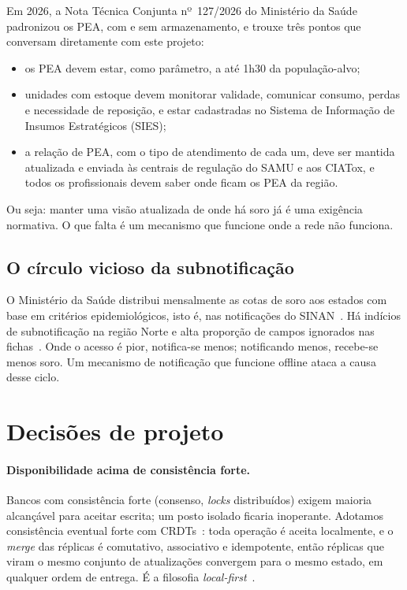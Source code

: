\documentclass[a4paper,12pt]{article}
\begin{document}
Em 2026, a Nota Técnica Conjunta nº~127/2026 do Ministério da
Saúde~\cite{nt127} padronizou os PEA, com e sem armazenamento, e trouxe três
pontos que conversam diretamente com este projeto:
\begin{itemize}
  \item os PEA devem estar, como parâmetro, a até 1h30 da população-alvo;
  \item unidades com estoque devem monitorar validade, comunicar consumo,
        perdas e necessidade de reposição, e estar cadastradas no Sistema de
        Informação de Insumos Estratégicos (SIES);
  \item a relação de PEA, com o tipo de atendimento de cada um, deve ser mantida
        atualizada e enviada às centrais de regulação do SAMU e aos CIATox,
        e todos os profissionais devem saber onde ficam os PEA da região.
\end{itemize}
Ou seja: manter uma visão atualizada de onde há soro já é uma exigência
normativa. O que falta é um mecanismo que funcione onde a rede não funciona.

\subsection{O círculo vicioso da subnotificação}

O Ministério da Saúde distribui mensalmente as cotas de soro aos estados com
base em critérios epidemiológicos, isto é, nas notificações do
SINAN~\cite{nt127}. Há indícios de subnotificação na região Norte e alta
proporção de campos ignorados nas fichas~\cite{completude2023}. Onde o
acesso é pior, notifica-se menos; notificando menos, recebe-se menos soro. Um
mecanismo de notificação que funcione offline ataca a causa desse ciclo.

\section{Decisões de projeto}
\label{sec:decisoes}

\paragraph{Disponibilidade acima de consistência forte.} Bancos com
consistência forte (consenso, \emph{locks} distribuídos) exigem maioria
alcançável para aceitar escrita; um posto isolado ficaria inoperante.
Adotamos consistência eventual forte com CRDTs~\cite{shapiro2011}: toda
operação é aceita localmente, e o \emph{merge} das réplicas é comutativo,
associativo e idempotente, então réplicas que viram o mesmo conjunto de
atualizações convergem para o mesmo estado, em qualquer ordem de entrega.
É a filosofia \emph{local-first}~\cite{kleppmann2019}.
\end{document}
